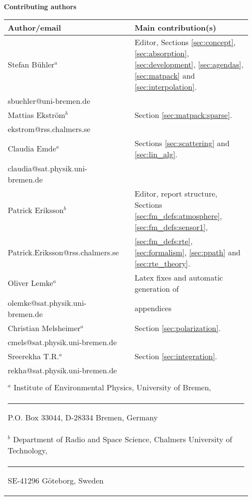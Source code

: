 %
\newpage
\thispagestyle{plain}
%
\begin{center}

{\Large \bf Contributing authors}
\vspace*{20mm}

\begin{tabular}{lp{10mm}l}
\hline
{\bf Author/email} & & {\bf Main contribution(s)} \\
\hline
  Stefan B\"uhler$^a$ & & Editor, Sections \ref{sec:concept},  
     \ref{sec:absorption}, \ref{sec:development}, \ref{sec:agendas},
     \ref{sec:matpack} and \ref{sec:interpolation}.\\
  sbuehler@uni-bremen.de & &        \\
\hline
  Mattias Ekstr\"om$^b$ & & Section \ref{sec:matpack:sparse}. \\
  ekstrom@rss.chalmers.se & & \\
\hline
  Claudia Emde$^a$ & & Sections \ref{sec:scattering} and \ref{sec:lin_alg}.\\
  claudia@sat.physik.uni-bremen.de & & \\
\hline
  Patrick Eriksson$^b$ &  & Editor, report structure, 
    Sections \ref{sec:fm_defs:atmosphere}, \ref{sec:fm_defs:sensor1}, \\
  Patrick.Eriksson@rss.chalmers.se & & 
    \ref{sec:fm_defs:rte}, \ref{sec:formalism}, \ref{sec:ppath} and 
    \ref{sec:rte_theory}.\\
\hline
  Oliver Lemke$^a$ & & Latex fixes and automatic generation of\\
  olemke@sat.physik.uni-bremen.de & & appendices\\
\hline
  Christian Melsheimer$^a$ & & Section \ref{sec:polarization}.\\
  cmels@sat.physik.uni-bremen.de & & \\
\hline
  Sreerekha T.R.$^a$ & & Section \ref{sec:integration}.\\
  rekha@sat.physik.uni-bremen.de & & \\
\hline
 && \\
\multicolumn{3}{l}{ $^a$
      Institute of Environmental Physics, University of Bremen, } \\
\multicolumn{3}{l}{\rule{1.5ex}{0pt}P.O. Box 33044, D-28334 Bremen, Germany} \\
\multicolumn{3}{l}{ $^b$
      Department of Radio and Space Science, 
      Chalmers University of Technology,} \\
\multicolumn{3}{l}{\rule{1.5ex}{0pt}SE-41296 G\"oteborg, Sweden} \\

\end{tabular}
\end{center}



